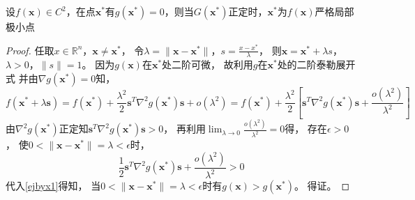     \begin{theorem}[二阶充分条件]
        设$f(\bm{x})\in C^2$，在点$\bm{x}^*$有$g(\bm{x}^*)=0$，则当$G(\bm{x}^*)$正定时，$\bm{x}^*$为$f(\bm{x})$严格局部极小点
    \end{theorem}
    \begin{proof}
        任取$x\in\mathbb{R}^n$，$\bm{x}\neq \bm{x}^*$，
        令$\lambda = \|\bm{x} - \bm{x}^*\|$，$s = \displaystyle\frac{x - x^*}{\lambda}$，
        则$\bm{x} = \bm{x}^* + \lambda s$，$\lambda > 0$，$\|s\|=1$。
        因为$g(\bm{x})$在$\bm{x}^*$处二阶可微，
        故利用$g$在$\bm{x}^*$处的二阶泰勒展开式
        并由$\nabla g(\bm{x}^*)=0$知，
        \begin{equation}\label{ejbyx1}
            f(\bm{x}^*+\lambda\bm{s}) = 
            f(\bm{x}^*) + \displaystyle\frac{\lambda^2}{2}\bm{s}^T\nabla^2g(\bm{x}^*)\bm{s} + o(\lambda^2) = 
            f(\bm{x}^*) + \displaystyle\frac{\lambda^2}{2}\left[\bm{s}^T\nabla^2g(\bm{x}^*)\bm{s} + \displaystyle\frac{o(\lambda^2)}{\lambda^2}\right]
        \end{equation}
        由$\nabla^2g(\bm{x}^*)$正定知$\bm{s}^T\nabla^2g(\bm{x}^*)\bm{s} > 0$，
        再利用$\displaystyle\lim_{\lambda\to0}\frac{o(\lambda^2)}{\lambda^2} = 0$得，
        存在$\epsilon > 0$，
        使$0 < \|\bm{x} - \bm{x}^*\| = \lambda < \epsilon$时，
        \begin{equation*}
            \displaystyle\frac{1}{2}\bm{s}^T\nabla^2g(\bm{x}^*)\bm{s} + \displaystyle\frac{o(\lambda^2)}{\lambda^2} >  0           
        \end{equation*}
        代入\ref{ejbyx1}得知，
        当$0 < \|\bm{x} - \bm{x}^*\| = \lambda < \epsilon$时有$g(\bm{x}) > g(\bm{x}^*)$。
        得证。
    \end{proof}

